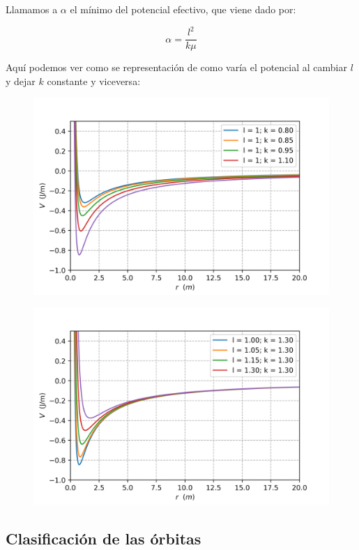 \documentclass[12pt,a4paper]{book}
\begin{document}
Llamamos a $\alpha$ el mínimo del potencial efectivo, que viene dado por:

\begin{equation}
\alpha = \dfrac{l^2}{k \mu}
\end{equation}

Aquí podemos ver como se representación de como varía el potencial al cambiar $l$ y dejar $k$ constante y viceversa:

\begin{figure}[h!] \centering
\includegraphics[scale=0.8]{gravedad_k.png}
\end{figure}

\begin{figure}[h!] \centering
\includegraphics[scale=0.8]{gravedad_l.png}
\end{figure}


\subsection{Clasificación de las órbitas}
\end{document}
